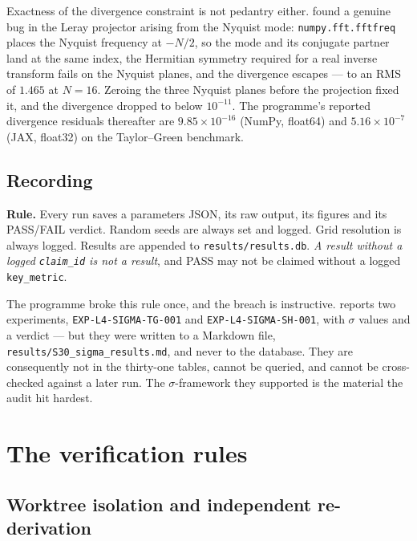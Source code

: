 Exactness of the divergence constraint is not pedantry either. 
found a genuine bug in the Leray projector arising from the Nyquist mode:
\texttt{numpy.fft.fftfreq} places the Nyquist frequency at \(-N/2\), so the
mode and its conjugate partner land at the same index, the Hermitian symmetry
required for a real inverse transform fails on the Nyquist planes, and the
divergence escapes --- to an RMS of \(1.465\) at \(N=16\). Zeroing the three
Nyquist planes before the projection fixed it, and the divergence dropped to
below \(10^{-11}\). The programme's reported divergence residuals thereafter
are \(9.85\times10^{-16}\) (NumPy, float64) and \(5.16\times10^{-7}\) (JAX,
float32) on the Taylor--Green benchmark.

\subsection{Recording}

\begin{record}
\textbf{Rule.} Every run saves a parameters JSON, its raw output, its figures
and its \textsf{PASS}/\textsf{FAIL} verdict. Random seeds are always set and
logged. Grid resolution is always logged. Results are appended to
\texttt{results/results.db}. \emph{A result without a logged
\texttt{claim\_id} is not a result}, and \textsf{PASS} may not be claimed
without a logged \texttt{key\_metric}.
\end{record}

The programme broke this rule once, and the breach is instructive. 
reports two experiments, \texttt{EXP-L4-SIGMA-TG-001} and
\texttt{EXP-L4-SIGMA-SH-001}, with \(\sigma\) values and a verdict --- but
they were written to a Markdown file, \texttt{results/S30\_sigma\_results.md},
and never to the database. They are consequently not in the thirty-one tables,
cannot be queried, and cannot be cross-checked against a later run. The
\(\sigma\)-framework they supported is the material the  audit hit
hardest.

\section{The verification rules}
\label{sec:verification-rules}

\subsection{Worktree isolation and independent re-derivation}

